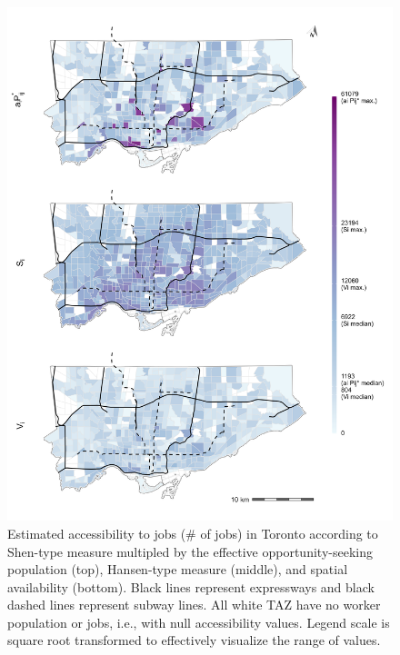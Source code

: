 \documentclass[10pt,letterpaper]{article}
\begin{document}
\begin{figure}
\includegraphics[width=1\linewidth]{images/Fig7} \caption{\label{fig:Fig7}Estimated accessibility to jobs (\# of jobs) in Toronto according to Shen-type measure multipled by the effective opportunity-seeking population (top), Hansen-type measure (middle), and spatial availability (bottom). Black lines represent expressways and black dashed lines represent subway lines. All white TAZ have no worker population or jobs, i.e., with null accessibility values. Legend scale is square root transformed to effectively visualize the range of values.}\label{fig:absolute-accessibility-plot}
\end{figure}
\end{document}

